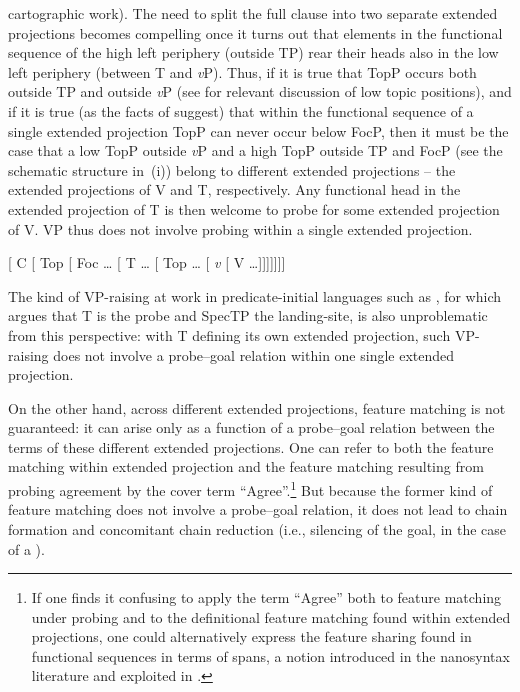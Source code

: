 \documentclass[output=paper]{langsci/langscibook}
\begin{document}
\begin{refcontext}
{    cartographic work). The need to split the full clause into two separate
    extended projections becomes compelling once it turns out that elements in
    the functional sequence of the high left periphery (outside TP) rear their
    heads also in the low left periphery (between T and \emph{v}P). Thus, if it is
    true that TopP occurs both outside TP and outside \emph{v}P (see
    \citealt{belletti04} for relevant discussion of low topic positions), and
    if it is true (as the facts of  suggest) that within the
    functional sequence of a single extended projection TopP can never occur
    below FocP, then it must be the case that a low TopP outside \emph{v}P and
    a high TopP outside TP and FocP (see the schematic structure
    in~(i)) belong to different extended projections -- the extended
    projections of V and T, respectively. Any functional head in the extended
    projection of T is then welcome to probe for some extended projection of V.
    VP  thus does not involve probing within a single extended
    projection.

\begin{exe}
     {}[ C [ Top [ Foc \ldots{} [
    T \ldots{} [ Top \ldots{} [ \emph{v} [ V \ldots{}]]]]]]] \label{fnexx}
\end{exe}
The kind of VP-raising at work in predicate-initial languages such as
,
for which \citet{massam01pred} argues that T is the probe and SpecTP the
landing-site, is also unproblematic from this perspective: with T defining its
own extended projection, such VP-raising does not involve a probe--goal relation
within one single extended projection.}

On the other hand, across different extended projections, feature matching is
not guaranteed: it can arise only as a function of a probe--goal relation
between the terms of these different extended projections. One can refer to
both the feature matching within extended projection and the feature matching
resulting from probing agreement by the cover term \enquote{Agree}.\footnote{If one
    finds it confusing to apply the term \enquote{Agree} both to feature matching
    under probing and to the definitional feature matching found within
extended projections, one could alternatively express the feature sharing found
in functional sequences in terms of spans, a notion introduced in the
nanosyntax literature and exploited in .} But because the
former kind of feature matching does not involve a probe--goal relation, it does
not lead to chain formation and concomitant chain reduction (i.e., silencing of
the goal, in the case of a ).


\end{refcontext}
\end{document}

